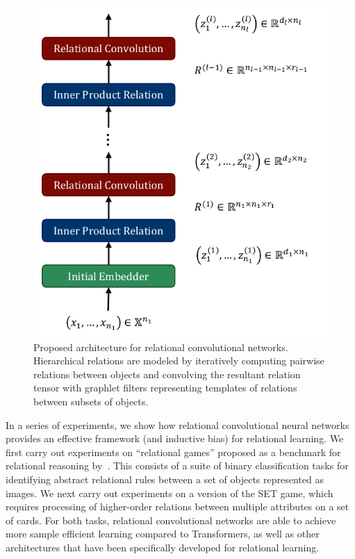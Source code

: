 \begin{figure}
    \vskip -20pt
    \centering
    \includegraphics[width=.5\textwidth]{figs/relconv_architecture.pdf}
    \vskip-5pt
    \caption{Proposed architecture for relational convolutional networks. Hierarchical relations are modeled by iteratively computing pairwise relations between objects and convolving the resultant relation tensor with graphlet filters representing templates of relations between subsets of objects.
    }\label{fig:relconv_architecture}
\end{figure}

In a series of experiments, we show how relational convolutional neural networks provides an effective framework (and inductive bias) for relational learning. We first carry out experiments on ``relational games'' proposed as a benchmark for relational reasoning by~\citep{shanahanExplicitlyRelationalNeural}. This consists of a suite of binary classification tasks for identifying abstract relational rules between a set of objects represented as images. We next carry out experiments on a version of the SET game, which requires processing of  higher-order relations between multiple attributes on a set of cards. For both tasks, relational convolutional networks are able to achieve more sample efficient learning compared to Transformers, as well as other architectures that have been specifically developed for relational learning.

